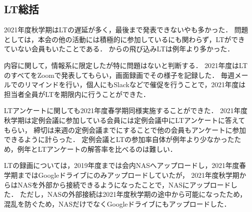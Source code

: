 \subsection*{LT総括}


2021年度秋学期はLTの遅延が多く，最後まで発表できない\firstGrade{}や\secondGrade{}も多かった．
問題としては，本会の他の活動には積極的に参加しているにも関わらず，LTができていない会員もいたことである．
\thirdGrade{}からの飛び込みLTは例年より多かった．

内容に関して，情報系に限定したが特に問題はないと判断する．
2021年度はLTのすべてをZoomで発表してもらい，画面録画でその様子を記録した．
毎週メールでのリマインドを行い，個人にもSlackなどで催促を行うことで，2021年度は担当者全員がLTを期限内に行うことができた．

LTアンケートに関しても2021年度春学期同様実施することができた．
2021年度秋学期は定例会議に参加している会員には定例会議中にLTアンケートに答えてもらい，
締切は来週の定例会議までにすることで他の会員もアンケートに参加できるように計らった．
定例会議とLTの参加率自体が例年より少なかったため，例年とLTアンケートの解答率を比べるのは難しい．

LTの録画については，2019年度までは会内NASへアップロードし，2021年度春学期まではGoogleドライブにのみアップロードしていたが，
2021年度秋学期からはNASを外部から接続できるようになったことで，NASにアップロードした．
ただし，NASの外部接続は2021年度秋学期の途中から可能になったため，混乱を防ぐため，NASだけでなくGoogleドライブにもアップロードした．
